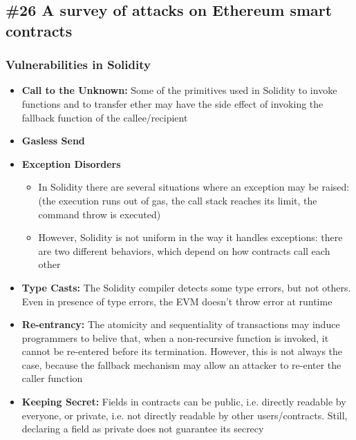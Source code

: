 \subsection{\#26 A survey of attacks on Ethereum smart contracts}
\subsubsection{Vulnerabilities in Solidity}
\begin{itemize}
	\item \textbf{Call to the Unknown:} Some of the primitives used in Solidity to invoke functions and to transfer ether may have the side effect of invoking the fallback function of the callee/recipient
	\item\textbf{Gasless Send}
	\item\textbf{Exception Disorders}
	\begin{itemize}
		\item In Solidity there are several situations where an exception may be raised: (the execution runs out of gas, the call stack reaches its limit, the command throw is executed)
		\item However, Solidity is not uniform in the way it handles exceptions: there are two different behaviors, which depend on how contracts call each other
	\end{itemize}
	\item\textbf{Type Casts:} The Solidity compiler detects some type errors, but not others. Even in presence of type errors, the EVM doesn't throw error at runtime
	\item\textbf{Re-entrancy:} The atomicity and sequentiality of transactions may induce programmers to belive that, when a non-recursive function is invoked, it cannot be re-entered before its termination. However, this is not always the case, because the fallback mechanism may allow an attacker to re-enter the caller function
	\item\textbf{Keeping Secret:} Fields in contracts can be public, i.e. directly readable by everyone, or private, i.e. not directly readable by other users/contracts. Still, declaring a field as private does not guarantee its secrecy
\end{itemize}
